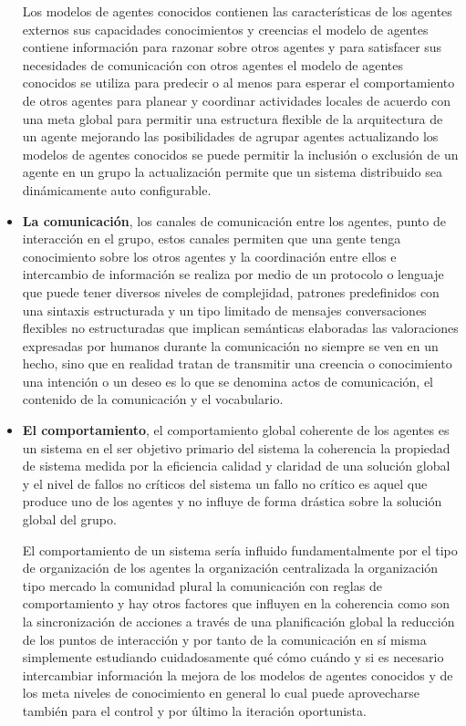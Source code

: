 \documentclass[12pt, twoside, openright]{report} %
\begin{document}
\begin{itemize}
	Los modelos de agentes conocidos contienen las características de los agentes externos sus capacidades conocimientos y creencias el modelo de agentes contiene información para razonar sobre otros agentes y para satisfacer sus necesidades de comunicación con otros agentes el modelo de agentes conocidos se utiliza para predecir o al menos para esperar el comportamiento de otros agentes para planear y coordinar actividades locales de acuerdo con una meta global para permitir una estructura flexible de la arquitectura de un agente mejorando las posibilidades de agrupar agentes actualizando los modelos de agentes conocidos se puede permitir la inclusión o exclusión de un agente en un grupo la actualización permite que un sistema distribuido sea dinámicamente auto configurable.
	\item \textbf{La comunicación}, los canales de comunicación entre los agentes, punto de interacción en el grupo, estos canales permiten que una gente tenga conocimiento sobre los otros agentes y la coordinación entre ellos e intercambio de información se realiza por medio de un protocolo o lenguaje que puede tener diversos niveles de complejidad, patrones predefinidos con una sintaxis estructurada y un tipo limitado de mensajes conversaciones flexibles no estructuradas que implican semánticas elaboradas las valoraciones expresadas por humanos durante la comunicación no siempre se ven en un hecho, sino que en realidad tratan de transmitir una creencia o conocimiento una intención o un deseo es lo que se denomina actos de comunicación, el contenido de la comunicación y el vocabulario.
	\item \textbf{El comportamiento}, el comportamiento global coherente de los agentes es un sistema en el ser objetivo primario del sistema la coherencia la propiedad de sistema medida por la eficiencia calidad y claridad de una solución global y el nivel de fallos no críticos del sistema un fallo no crítico es aquel que produce uno de los agentes y no influye de forma drástica sobre la solución global del grupo.
	
	El comportamiento de un sistema sería influido fundamentalmente por el tipo de organización de los agentes la organización centralizada la organización tipo mercado la comunidad plural la comunicación con reglas de comportamiento y hay otros factores que influyen en la coherencia como son la sincronización de acciones a través de una planificación global la reducción de los puntos de interacción y por tanto de la comunicación en sí misma simplemente estudiando cuidadosamente qué cómo cuándo y si es necesario intercambiar información la mejora de los modelos de agentes conocidos y de los meta niveles de conocimiento en general lo cual puede aprovecharse también para el control y por último la iteración oportunista.
\end{itemize}
\end{document}
